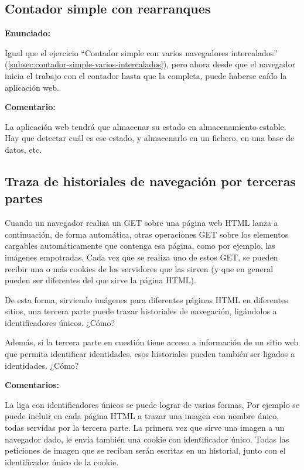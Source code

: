 \subsection{Contador simple con rearranques}
\label{subsec:contador-simple-rearranques}

\textbf{Enunciado:}

Igual que el ejercicio ``Contador simple con varios navegadores intercalados'' (\ref{subsec:contador-simple-varios-intercalados}), pero ahora desde que el navegador inicia el trabajo con el contador hasta que la completa, puede haberse caído la aplicación web.

\textbf{Comentario:}

La aplicación web tendrá que  almacenar su estado en almacenamiento estable. Hay que detectar cuál es ese estado, y almacenarlo en  un fichero, en  una base de datos, etc.



\subsection{Traza de historiales de navegación por terceras partes}
\label{subsec:navegacion-terceras-partes}

Cuando un navegador realiza un GET sobre una página web HTML lanza a continuación, de forma automática, otras operaciones GET sobre los elementos cargables automáticamente que contenga esa página, como por ejemplo, las imágenes empotradas. Cada vez que se realiza uno de estos GET, se pueden recibir una o más cookies de los servidores que las sirven (y que en general pueden ser diferentes del que sirve la página HTML).

De esta forma, sirviendo imágenes para diferentes páginas HTML en diferentes sitios, una tercera parte puede trazar historiales de navegación, ligándolos a identificadores únicos. ¿Cómo?

Además, si la tercera parte en cuestión tiene acceso a información de un sitio web que permita identificar identidades, esos historiales pueden también ser ligados a identidades. ¿Cómo?

\textbf{Comentarios:}

La liga con identificadores únicos se puede lograr de varias formas, Por ejemplo se puede incluir en cada página HTML a trazar una imagen con nombre único, todas servidas por la tercera parte. La primera vez que sirve una imagen a un navegador dado, le envía también una cookie con identificador único. Todas las peticiones de imagen que se reciban serán escritas en un historial, junto con el identificador único de la cookie.


